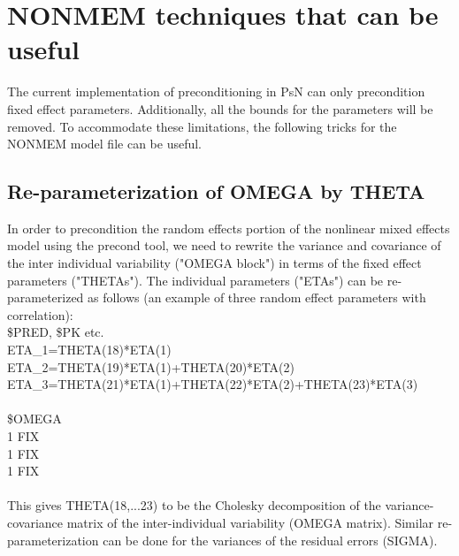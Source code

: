 \section{NONMEM techniques that can be useful}
The current implementation of preconditioning in PsN can only precondition fixed effect parameters. Additionally, all the bounds for the parameters will be removed.  To accommodate these limitations, the following tricks for the NONMEM model file can be useful.
\subsection{Re-parameterization of OMEGA by THETA} \label{app::repara}
In order to precondition the random effects portion of the nonlinear mixed effects model using the precond tool, we need to rewrite the variance and covariance of the inter individual variability ("OMEGA block") in terms of the fixed effect parameters ("THETAs").  The individual parameters ("ETAs") can be re-parameterized as follows (an example of three random effect parameters with correlation):\\
\$PRED, \$PK etc.\\
ETA\_1=THETA(18)*ETA(1)\\
ETA\_2=THETA(19)*ETA(1)+THETA(20)*ETA(2)\\
ETA\_3=THETA(21)*ETA(1)+THETA(22)*ETA(2)+THETA(23)*ETA(3)\\
\\
\$OMEGA\\  1  FIX\\
 1  FIX\\
 1  FIX\\
 \\
This gives THETA(18,...23) to be the Cholesky decomposition of the variance-covariance matrix of the inter-individual variability (OMEGA matrix). Similar re-parameterization can be done for the variances of the residual errors (SIGMA).

